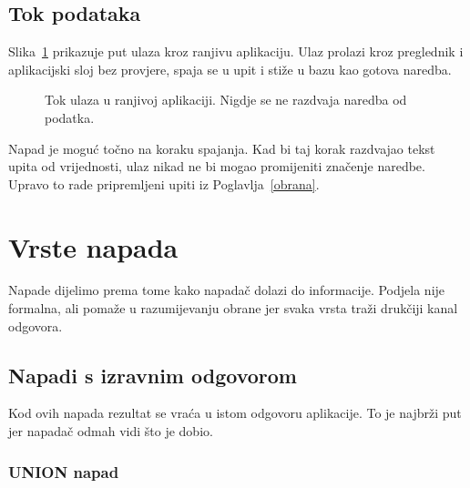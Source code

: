 \documentclass{mathos}
\begin{document}
\section{Tok podataka}

Slika~\ref{fig:tok} prikazuje put ulaza kroz ranjivu aplikaciju. Ulaz prolazi kroz preglednik i aplikacijski sloj bez provjere, spaja se u upit i stiže u bazu kao gotova naredba.

\begin{figure}[h!]
\centering
{}
\caption{Tok ulaza u ranjivoj aplikaciji. Nigdje se ne razdvaja naredba od podatka.}
\label{fig:tok}
\end{figure}

\noindent
Napad je moguć točno na koraku spajanja. Kad bi taj korak razdvajao tekst upita od vrijednosti, ulaz nikad ne bi mogao promijeniti značenje naredbe. Upravo to rade pripremljeni upiti iz Poglavlja~\ref{obrana}.


\chapter{Vrste napada}\label{vrste}

Napade dijelimo prema tome kako napadač dolazi do informacije. Podjela nije formalna, ali pomaže u razumijevanju obrane jer svaka vrsta traži drukčiji kanal odgovora.

\section{Napadi s izravnim odgovorom}

Kod ovih napada rezultat se vraća u istom odgovoru aplikacije. To je najbrži put jer napadač odmah vidi što je dobio.

\subsection{UNION napad}
\end{document}

